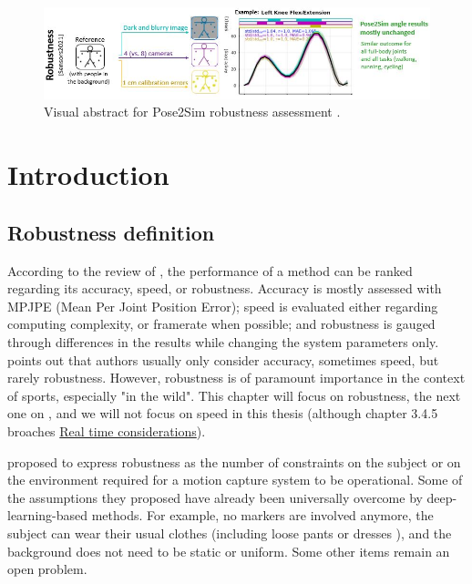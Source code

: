 \pagebreak
\minitoc

\vspace*{3cm}

\begin{figure}[hbtp]
	\centering
	\def\svgwidth{1\columnwidth}
	\fontsize{10pt}{10pt}\selectfont
	\includegraphics[width=\linewidth]{"../Intro/Figures/Fig_VisAbstract2.JPG"}
      \caption{Visual abstract for Pose2Sim robustness assessment \cite{Pagnon2021}.}
	\label{fig_visabstract2}
\end{figure}

\newpage


\section{Introduction}
\subsection{Robustness definition}

According to the review of \cite{Desmarais2021}, the performance of a method can be ranked regarding its accuracy, speed, or robustness. Accuracy is mostly assessed with MPJPE (Mean Per Joint Position Error); speed is evaluated either regarding computing complexity, or framerate when possible; and robustness is gauged through differences in the results while changing the system parameters only. \cite{Desmarais2021} points out that authors usually only consider accuracy, sometimes speed, but rarely robustness. However, robustness is of paramount importance in the context of sports, especially "in the wild". This chapter will focus on robustness, the next one on , and we will not focus on speed in this thesis (although chapter 3.4.5 broaches \hyperref[subsec:realtime]{Real time considerations}).

\cite{Moeslund2001} proposed to express robustness as the number of constraints on the subject or on the environment required for a motion capture system to be operational. Some of the assumptions they proposed have already been universally overcome by deep-learning-based methods. For example, no markers are involved anymore, the subject can wear their usual clothes (including loose pants or dresses \cite{Viswakumar2019}), and the background does not need to be static or uniform. Some other items remain an open problem.

